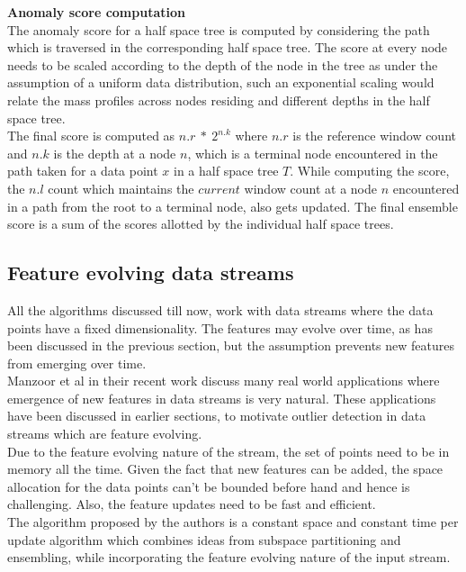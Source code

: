 \noindent \textbf{Anomaly score computation} \\

The anomaly score for a half space tree is computed by considering the path which is traversed in the corresponding half space tree. The score at every node needs to be scaled according to the depth of the node in the tree as under the assumption of a uniform data distribution, such an exponential scaling would relate the mass profiles across nodes residing and different depths in the half space tree. \\ 

The final score is computed as $n.r\ *\ 2^{n.k}$ where $n.r$ is the reference window count and $n.k$ is the depth at a node $n$, which is a terminal node encountered in the path taken for a data point $x$ in a half space tree $T$. While computing the score, the $n.l$ count which maintains the $current$ window count at a node $n$ encountered in a path from the root to a terminal node, also gets updated. The final ensemble score is a sum of the scores allotted by the individual half space trees. 

\subsection{Feature evolving data streams}

All the algorithms discussed till now, work with data streams where the data points have a fixed dimensionality. The features may evolve over time, as has been discussed in the previous section, but the assumption prevents new features from emerging over time. \\

Manzoor et al in their recent work\cite{Manzoor:2018:XOD:3219819.3220107} discuss many real world applications where emergence of new features in data streams is very natural. These applications have been discussed in earlier sections, to motivate outlier detection in data streams which are feature evolving. \\ 

Due to the feature evolving nature of the stream, the set of points need to be in memory all the time. Given the fact that new features can be added, the space allocation for the data points can't be bounded before hand and hence is challenging. Also, the feature updates need to be fast and efficient. \\

The algorithm proposed by the authors is a constant space and constant time per update algorithm which combines ideas from subspace partitioning and ensembling, while incorporating the feature evolving nature of the input stream. \\

